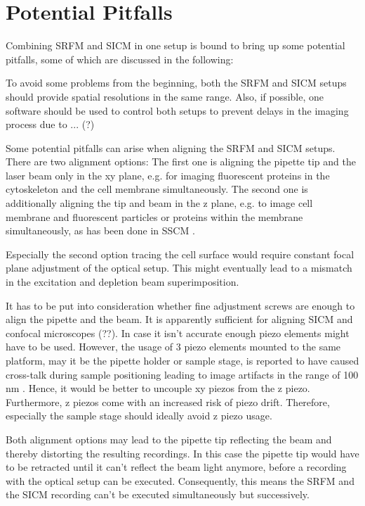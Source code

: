 \section{Potential Pitfalls}
\label{sec:pitfalls}
Combining SRFM and SICM in one setup is bound to bring up some potential
pitfalls, some of which are discussed in the following:

To avoid some problems from the beginning, both the SRFM and SICM setups
should provide spatial resolutions in the same range. Also, if possible, one
software should be used to control both setups to prevent delays in the
imaging process due to ... (?)

Some potential pitfalls can arise when aligning the SRFM and SICM
setups. There are two alignment options: The first one is aligning the pipette
tip and the laser beam only in the xy plane, e.g. for imaging fluorescent
proteins in the cytoskeleton and the cell membrane simultaneously. The second
one is additionally aligning the tip and beam in the z plane, e.g. to image
cell membrane and fluorescent particles or proteins within the membrane
simultaneously, as has been done in SSCM \cite{Gorelik2002a}\cite{Shevchuk2008}.

Especially the second option tracing the cell surface would require constant
focal plane adjustment of the optical setup. This might eventually lead to a
mismatch in the excitation and depletion beam superimposition.

It has to be put into consideration whether fine adjustment screws are enough
to align the pipette and the beam. It is apparently sufficient for aligning
SICM and confocal microscopes (??). In case it isn't accurate enough piezo
elements might have to be used. However, the usage of 3 piezo elements mounted
to the same platform, may it be the pipette holder or sample stage, is
reported to have caused cross-talk during sample positioning leading to image
artifacts in the range of 100 nm \cite{Shevchuk.2013}. Hence, it would be
better to uncouple xy piezos from the z piezo. Furthermore, z piezos come with
an increased risk of piezo drift. Therefore, especially the sample stage
should ideally avoid z piezo usage.

Both alignment options may lead to the pipette tip reflecting the beam and
thereby distorting the resulting recordings. In this case the pipette tip
would have to be retracted until it can't reflect the beam light anymore,
before a recording with the optical setup can be executed. Consequently, this
means the SRFM and the SICM recording can't be executed simultaneously but
successively.

